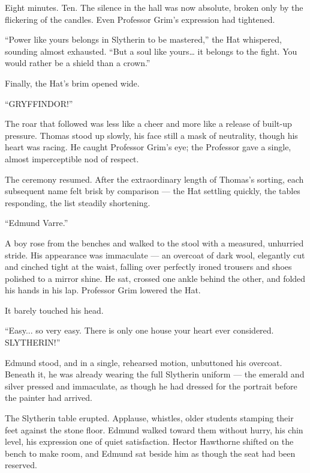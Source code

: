 Eight minutes. Ten. The silence in the hall was now absolute, broken only by the flickering of the candles. Even Professor Grim's expression had tightened.
 
\enquote{Power like yours belongs in Slytherin to be mastered,} the Hat whispered, sounding almost exhausted. \enquote{But a soul like yours\ldots{} it belongs to the fight. You would rather be a shield than a crown.}
 
Finally, the Hat's brim opened wide.
 
\enquote{GRYFFINDOR!}
 
The roar that followed was less like a cheer and more like a release of built-up pressure. Thomas stood up slowly, his face still a mask of neutrality, though his heart was racing. He caught Professor Grim's eye; the Professor gave a single, almost imperceptible nod of respect.
 
The ceremony resumed. After the extraordinary length of Thomas's sorting, each subsequent name felt brisk by comparison --- the Hat settling quickly, the tables responding, the list steadily shortening.

\vspace{1.5\baselineskip}

\enquote{Edmund Varre.}

A boy rose from the benches and walked to the stool with a measured, unhurried stride. His appearance was immaculate --- an overcoat of dark wool, elegantly cut and cinched tight at the waist, falling over perfectly ironed trousers and shoes polished to a mirror shine. He sat, crossed one ankle behind the other, and folded his hands in his lap. Professor Grim lowered the Hat.

It barely touched his head.

\enquote{Easy... so very easy. There is only one house your heart ever considered. SLYTHERIN!}

Edmund stood, and in a single, rehearsed motion, unbuttoned his overcoat. Beneath it, he was already wearing the full Slytherin uniform --- the emerald and silver pressed and immaculate, as though he had dressed for the portrait before the painter had arrived.

The Slytherin table erupted. Applause, whistles, older students stamping their feet against the stone floor. Edmund walked toward them without hurry, his chin level, his expression one of quiet satisfaction. Hector Hawthorne shifted on the bench to make room, and Edmund sat beside him as though the seat had been reserved.

